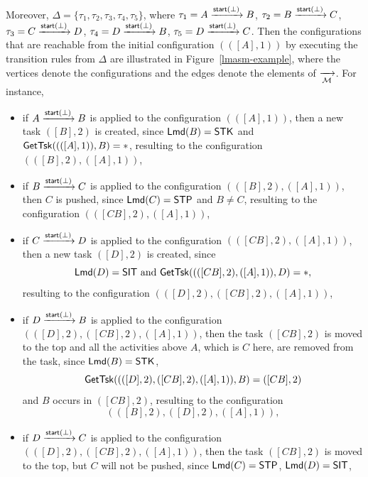 \begin{example}
		Moreover, $\Delta = \{\tau_1, \tau_2, \tau_3, \tau_4, \tau_5\}$, where 
		$\tau_1 = A \xrightarrow{{\mathsf{start} }(\bot)} B$,
		$\tau_2 = B \xrightarrow{{\mathsf{start} }(\bot)} C$,
		$\tau_3 = C \xrightarrow{{\mathsf{start} }(\bot)} D$,
		$\tau_4 = D \xrightarrow{{\mathsf{start} }(\bot)} B$,
		$\tau_5 = D \xrightarrow{{\mathsf{start} }(\bot)} C$.
		Then the configurations that are reachable from the initial configuration $(([A], 1))$ by executing the transition rules from $\Delta$ are illustrated in Figure~\ref{lmasm-example}, where the vertices denote the configurations and the edges denote the elements of $\xrightarrow[{\mathcal{M} }]{}$. 
		For instance, 
		\begin{itemize}
			\item if $A \xrightarrow{{\mathsf{start} }(\bot)} B$ is applied to the configuration $(([A], 1))$, then a new task $([B],2)$ is created, since ${\sf Lmd}(B) = \mathsf{STK}$ and $\mathsf{GetTsk}((([A],1)), B) = *$, resulting to the configuration $(([B],2),([A],1))$,
			\item if $B \xrightarrow{{\mathsf{start} }(\bot)} C$ is applied to the configuration $(([B],2),([A],1))$, then $C$ is pushed, since ${\sf Lmd}(C) = \mathsf{STP}$ and $B\neq C$, resulting to the configuration $(([CB],2),([A],1))$,
			\item if $C \xrightarrow{{\mathsf{start} }(\bot)} D$ is applied to the configuration $(([CB],2),([A],1))$, then a new task $([D], 2)$ is created, since 
			$${\sf Lmd}(D) = \mathsf{SIT} \mbox{ and } \mathsf{GetTsk}((([CB],2),([A],1)), D) = *,$$ 
			resulting to the configuration $(([D],2),([CB],2),([A],1))$,
			\item if $D \xrightarrow{{\mathsf{start} }(\bot)} B$ is applied to the configuration $(([D],2),([CB],2),([A],1))$, then the task $([CB],2)$ is moved to the top and all the activities above $A$, which is $C$ here, are removed from the task, since ${\sf Lmd}(B) = \mathsf{STK}$, 
			$$\mathsf{GetTsk}((([D],2),([CB],2),([A],1)), B) = ([CB],2)$$
			and $B$ occurs in $([CB], 2)$, resulting to the configuration 
			$$(([B],2),([D],2),([A],1)),$$
			\item if $D \xrightarrow{{\mathsf{start} }(\bot)} C$ is applied to the configuration $(([D],2),([CB],2),([A],1))$, then the task $([CB],2)$ is moved to the top, but $C$ will not be pushed, since ${\sf Lmd}(C) = \mathsf{STP}$, ${\sf Lmd}(D) = \mathsf{SIT}$,

\end{itemize}
\end{example}
